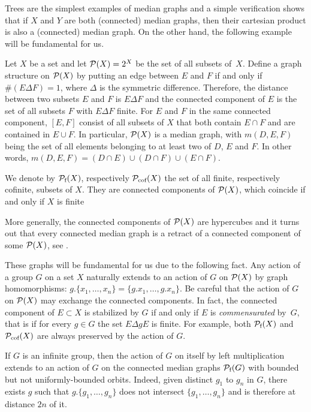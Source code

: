 Trees are the simplest examples of median graphs and a simple verification shows that if $X$ and $Y$ are both (connected) median graphs, then their cartesian product is also a (connected) median graph.
On the other hand, the following example will be fundamental for us.
%
%
\begin{exmp}\label{Ex:MainMedian}
Let $X$ be a set and let  $\mathcal P(X)=2^X$ be the set of all subsets of~$X$.
Define a graph structure on $\mathcal P(X)$ by putting an edge between $E$ and $F$ if and only if $\#(E\Delta F)=1$, where $\Delta$ is the symmetric difference.
Therefore, the distance between two subsets $E$ and $F$ is $E\Delta F$ and
the connected component of $E$ is the set of all subsets $F$ with $E\Delta F$ finite.
For $E$ and $F$ in the same connected component, $[E,F]$ consist of all subsets of $X$ that both contain $E\cap F$ and are contained in $E\cup F$.
In particular, $\mathcal P(X)$ is a median graph, with $m(D,E,F)$ being the set of all elements belonging to at least two of $D$, $E$ and $F$. In other words, $m(D,E,F)=(D\cap E)\cup(D\cap F)\cup(E\cap F)$.
\end{exmp}
%
%
We denote by $\mathcal P_{\textnormal{f}}(X)$, respectively $\mathcal P_{\textnormal{cof}}(X)$ the set of all finite, respectively cofinite, subsets of $X$.
They are connected components of $\mathcal P(X)$, which coincide if and only if $X$ is finite

More generally, the connected components of $\mathcal P(X)$ are hypercubes and it turns out that every connected median graph is a retract of a connected component of some $\mathcal P(X)$, see \cite{Bandelt1984}.

These graphs will be fundamental for us due to the following fact.
Any action of a group $G$ on a set $X$ naturally extends to an action of $G$ on $\mathcal P(X)$ by graph homomorphisms: $g.\{x_1,\dots,x_n\}=\{g.x_1,\dots,g.x_n\}$.
Be careful that the action of $G$ on $\mathcal P(X)$ may exchange the connected components.
In fact, the connected component of $E\subset X$ is stabilized by $G$ if and only if $E$ is \emph{commensurated} by~$G$, that is if for every $g\in G$ the set $E\Delta gE$ is finite.
For example, both $\mathcal P_{\textnormal{f}}(X)$ and $\mathcal P_{\textnormal{cof}}(X)$ are always preserved by the action of $G$.

If $G$ is an infinite group, then the action of $G$ on itself by left multiplication extends to an action of $G$ on the connected median graphs $\mathcal P_{\textnormal{f}}(G)$ with bounded but not uniformly-bounded orbits. Indeed, given distinct $g_1$ to $g_n$ in $G$, there exists $g$ such that $g.\{g_1,\dots,g_n\}$ does not intersect $\{g_1,\dots,g_n\}$ and is therefore at distance $2n$ of it.

